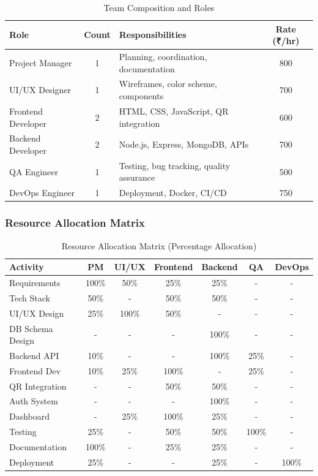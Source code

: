 \documentclass[12pt,a4paper]{article}
\begin{document}
\begin{table}[H]
\centering
\begin{tabular}{|l|c|l|c|}
\hline
\textbf{Role} & \textbf{Count} & \textbf{Responsibilities} & \textbf{Rate (₹/hr)} \\
\hline
Project Manager & 1 & Planning, coordination, documentation & 800 \\
\hline
UI/UX Designer & 1 & Wireframes, color scheme, components & 700 \\
\hline
Frontend Developer & 2 & HTML, CSS, JavaScript, QR integration & 600 \\
\hline
Backend Developer & 2 & Node.js, Express, MongoDB, APIs & 700 \\
\hline
QA Engineer & 1 & Testing, bug tracking, quality assurance & 500 \\
\hline
DevOps Engineer & 1 & Deployment, Docker, CI/CD & 750 \\
\hline
\end{tabular}
\caption{Team Composition and Roles}
\end{table}

\subsubsection{Resource Allocation Matrix}

\begin{table}[H]
\centering
\small
\begin{tabular}{|l|c|c|c|c|c|c|}
\hline
\textbf{Activity} & \textbf{PM} & \textbf{UI/UX} & \textbf{Frontend} & \textbf{Backend} & \textbf{QA} & \textbf{DevOps} \\
\hline
Requirements & 100\% & 50\% & 25\% & 25\% & - & - \\
\hline
Tech Stack & 50\% & - & 50\% & 50\% & - & - \\
\hline
UI/UX Design & 25\% & 100\% & 50\% & - & - & - \\
\hline
DB Schema Design & - & - & - & 100\% & - & - \\
\hline
Backend API & 10\% & - & - & 100\% & 25\% & - \\
\hline
Frontend Dev & 10\% & 25\% & 100\% & - & 25\% & - \\
\hline
QR Integration & - & - & 50\% & 50\% & - & - \\
\hline
Auth System & - & - & - & 100\% & - & - \\
\hline
Dashboard & - & 25\% & 100\% & 25\% & - & - \\
\hline
Testing & 25\% & - & 50\% & 50\% & 100\% & - \\
\hline
Documentation & 100\% & - & 25\% & 25\% & - & - \\
\hline
Deployment & 25\% & - & - & 25\% & - & 100\% \\
\hline
\end{tabular}
\caption{Resource Allocation Matrix (Percentage Allocation)}
\end{table}
\end{document}
